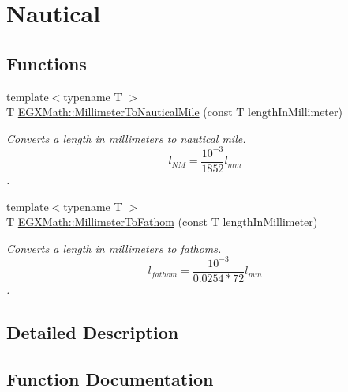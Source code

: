 \hypertarget{group___e_g_x_math-_conversions-_length_conversions-_s_i-_millimeter-_nautical}{}\section{Nautical}
\label{group___e_g_x_math-_conversions-_length_conversions-_s_i-_millimeter-_nautical}
\subsection*{Functions}
\begin{DoxyCompactItemize}
\item 
{\footnotesize template$<$typename T $>$ }\\T \mbox{\hyperlink{group___e_g_x_math-_conversions-_length_conversions-_s_i-_millimeter-_nautical_ga05ed5fb1300287763d8927ee90315808}{E\+G\+X\+Math\+::\+Millimeter\+To\+Nautical\+Mile}} (const T length\+In\+Millimeter)
\begin{DoxyCompactList}\small\item\em Converts a length in millimeters to nautical mile. \[ l_{NM}= \frac{10^{-3}}{1852} l_{mm} \]. \end{DoxyCompactList}\item 
{\footnotesize template$<$typename T $>$ }\\T \mbox{\hyperlink{group___e_g_x_math-_conversions-_length_conversions-_s_i-_millimeter-_nautical_ga1dce4ee3123e0132aae95bc9f7d0ac31}{E\+G\+X\+Math\+::\+Millimeter\+To\+Fathom}} (const T length\+In\+Millimeter)
\begin{DoxyCompactList}\small\item\em Converts a length in millimeters to fathoms. \[ l_{fathom}= \frac{10^{-3}}{0.0254 * 72} l_{mm} \]. \end{DoxyCompactList}\end{DoxyCompactItemize}


\subsection{Detailed Description}


\subsection{Function Documentation}
\mbox{\label{group___e_g_x_math-_conversions-_length_conversions-_s_i-_millimeter-_nautical_ga1dce4ee3123e0132aae95bc9f7d0ac31}} 
